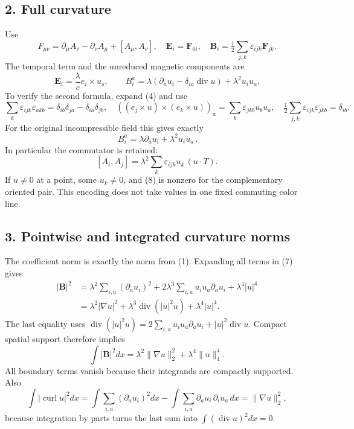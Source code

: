 \documentclass[
  11pt,
]{article}
\begin{document}
\subsection{2. Full curvature}\label{weak-coupling-part-18-full-curvature}

Use \[
 F_{\mu\nu}=\partial_\mu A_\nu-\partial_\nu A_\mu+[A_\mu,A_\nu],
 \quad
 \mathbf E_i=\mathbf F_{0i},\quad
 \mathbf B_i=\tfrac12\sum_{j,k}\varepsilon_{ijk}\mathbf F_{jk}.
 \tag{4}
\] The temporal term and the unreduced magnetic components are \[
 \mathbf E_i=\frac{\lambda}{c}e_i\times u_s,\qquad
 B_i^a=\lambda(\partial_a u_i-\delta_{ia}\operatorname{div}u)
                    +\lambda^2u_i u_a.
 \tag{5}
\] To verify the second formula, expand (4) and use \[
 \sum_k\varepsilon_{ijk}\varepsilon_{akb}
       =\delta_{ib}\delta_{ja}-\delta_{ia}\delta_{jb},
 \quad
 ((e_j\times u)\times(e_k\times u))_a
       =\sum_b\varepsilon_{jkb}u_bu_a,
 \quad
 \tfrac12\sum_{j,k}\varepsilon_{ijk}\varepsilon_{jkb}=\delta_{ib}.
 \tag{6}
\] For the original incompressible field this gives exactly \[
 \boxed{\,B_i^a=\lambda\partial_a u_i+\lambda^2u_i u_a\,}.
 \tag{7}
\] In particular the commutator is retained: \[
 [A_i,A_j]=\lambda^2\sum_k\varepsilon_{ijk}u_k\,(u\cdot T).
 \tag{8}
\] If \(u\ne0\) at a point, some \(u_k\ne0\), and (8) is nonzero for the
complementary oriented pair. This encoding does not take values in one
fixed commuting color line.

\subsection{3. Pointwise and integrated curvature
norms}\label{weak-coupling-part-18-pointwise-and-integrated-curvature-norms}

The coefficient norm is exactly the norm from (1). Expanding all terms
in (7) gives \[
 \begin{aligned}
 |\mathbf B|^2
 &=\lambda^2\sum_{i,a}(\partial_a u_i)^2
   +2\lambda^3\sum_{i,a}u_i u_a\partial_a u_i+\lambda^4|u|^4\\
 &=\lambda^2|\nabla u|^2+
   \lambda^3\operatorname{div}(|u|^2u)+\lambda^4|u|^4 .
 \end{aligned}
 \tag{9}
\] The last equality uses \(\operatorname{div}(|u|^2u)=
 2\sum_{i,a}u_i u_a\partial_a u_i+|u|^2\operatorname{div}u\). Compact
spatial support therefore implies \[
 \boxed{\ \int|\mathbf B|^2dx
  =\lambda^2\|\nabla u\|_2^2+\lambda^4\|u\|_4^4.\ }
 \tag{10}
\] All boundary terms vanish because their integrands are compactly
supported. Also \[
 \int|\operatorname{curl}u|^2dx
 =\int\sum_{i,a}(\partial_a u_i)^2dx
   -\int\sum_{i,a}\partial_a u_i\,\partial_i u_a\,dx
 =\|\nabla u\|_2^2,
 \tag{11}
\] because integration by parts turns the last sum into
\(\int(\operatorname{div}u)^2dx=0\).
\end{document}
